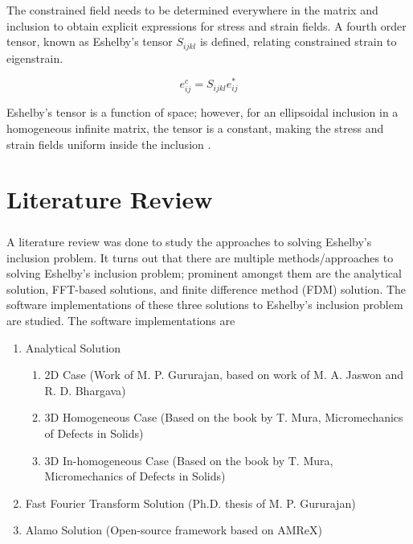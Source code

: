 \documentclass[12pt, a4paper]{report}
\begin{document}
\begin{enumerate}
        The constrained field needs to be determined everywhere in the matrix and inclusion to obtain explicit expressions for stress and strain fields. A fourth order tensor, known as Eshelby's tensor $S_{ijkl}$ is defined, relating constrained strain to eigenstrain.

        \begin{equation}
            e^{c}_{ij} = S_{ijkl}e^{*}_{ij}
        \end{equation}

        Eshelby's tensor is a function of space; however, for an ellipsoidal inclusion in a homogeneous infinite matrix, the tensor is a constant, making the stress and strain fields uniform inside the inclusion \cite{stanford_notes}.
\end{enumerate}

\chapter{Literature Review}
\paragraph{}
A literature review was done to study the approaches to solving Eshelby’s inclusion problem. It turns out that there are multiple methods/approaches to solving Eshelby’s inclusion problem; prominent amongst them are the analytical solution, FFT-based solutions, and finite difference method (FDM) solution. The software implementations of these three solutions to Eshelby’s inclusion problem are studied. The software implementations are
\begin{enumerate}
    \item Analytical Solution
    \begin{enumerate}
        \item 2D Case (Work of M. P. Gururajan, based on work of M. A. Jaswon and R. D. Bhargava) \cite{jaswon_bhargava_1961}
        \item 3D Homogeneous Case (Based on the book by T. Mura, Micromechanics of Defects in Solids) \cite{mura1987micromechanics}
        \item 3D In-homogeneous Case (Based on the book by T. Mura, Micromechanics of Defects in Solids) \cite{mura1987micromechanics}
    \end{enumerate}
    \item Fast Fourier Transform Solution (Ph.D. thesis of M. P. Gururajan) \cite{Guru_thesis}
    \item Alamo Solution (Open-source framework based on AMReX) \cite{Runnels_2021}
\end{enumerate}
\end{document}
